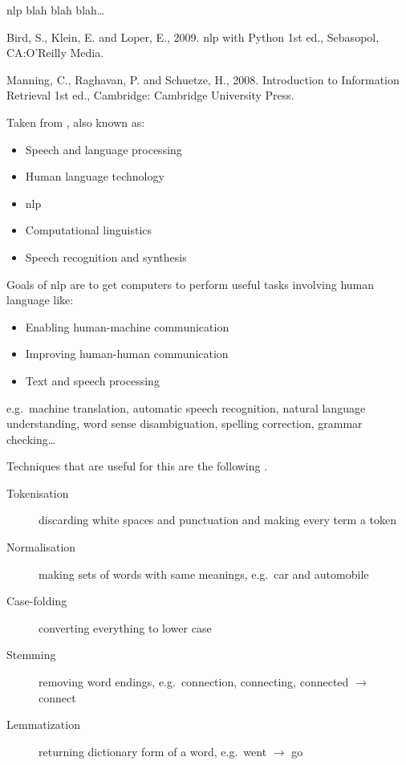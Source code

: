 \ac{nlp} blah blah blah\ldots

Bird, S., Klein, E. and Loper, E., 2009. \ac{nlp} with Python 1st ed., Sebasopol, CA:\@ O'Reilly Media.\autocite{Bird2009}

Manning, C., Raghavan, P. and Schuetze, H., 2008. Introduction to Information Retrieval 1st ed., Cambridge: Cambridge University Press.\autocite{Manning2009}

Taken from \autocite{Jurafsky2009}, also known as:
\begin{itemize}
  \item Speech and language processing
  \item Human language technology
  \item \ac{nlp}
  \item Computational linguistics
  \item Speech recognition and synthesis
\end{itemize}

Goals of \ac{nlp} are to get computers to perform useful tasks involving human language like:
\begin{itemize}
  \item Enabling human-machine communication
  \item Improving human-human communication
  \item Text and speech processing
\end{itemize}

e.g.\ machine translation, automatic speech recognition, natural language understanding, word sense disambiguation, spelling correction, grammar checking…

\label{stemming}
\hypertarget{stemming}{Techniques} that are useful for this are the following \autocite[Ch.2]{Manning2009}.

\begin{description}
  \item [Tokenisation] discarding white spaces and punctuation and making every term a token
  \item [Normalisation] making sets of words with same meanings, e.g.\ car and automobile
  \item [Case-folding] converting everything to lower case
  \item [Stemming] removing word endings, e.g.\ connection, connecting, connected $\to$ connect
  \item [Lemmatization] returning dictionary form of a word, e.g.\ went $\to$ go
\end{description}


